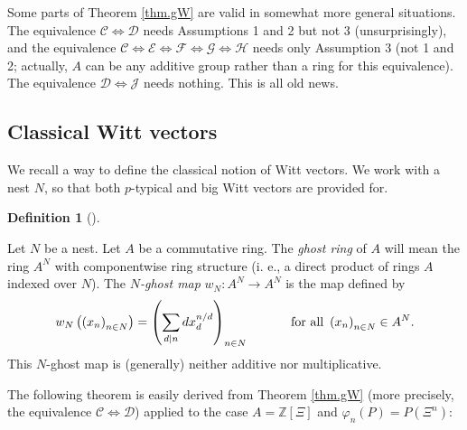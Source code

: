 \documentclass[numbers=enddot,12pt,final,onecolumn,notitlepage]{scrartcl}%
\theoremstyle{definition}
\newtheorem{defi}[theo]{Definition}
\newenvironment{definition}[1][]
{\begin{defi}[#1]\begin{leftbar}}
{\end{leftbar}\end{defi}}
\let\sumnonlimits\sum
\renewcommand{\sum}{\sumnonlimits\limits}
\begin{document}
Some parts of Theorem \ref{thm.gW} are valid in somewhat more general
situations. The equivalence $\mathcal{C}\Longleftrightarrow\mathcal{D}$ needs
Assumptions 1 and 2 but not 3 (unsurprisingly), and the equivalence
$\mathcal{C}\Longleftrightarrow\mathcal{E}\Longleftrightarrow\mathcal{F}%
\Longleftrightarrow\mathcal{G}\Longleftrightarrow\mathcal{H}$ needs only
Assumption 3 (not 1 and 2; actually, $A$ can be any additive group rather than
a ring for this equivalence). The equivalence $\mathcal{D}\Longleftrightarrow
\mathcal{J}$ needs nothing. This is all old news.

\subsection{Classical Witt vectors}

We recall a way to define the classical notion of Witt vectors. We work with a
nest $N$, so that both $p$-typical and big Witt vectors are provided for.

\begin{definition}
\label{def.Witt.ghostmap}Let $N$ be a nest. Let $A$ be a commutative ring. The
\textit{ghost ring} of $A$ will mean the ring $A^{N}$ with componentwise ring
structure (i. e., a direct product of rings $A$ indexed over $N$). The
$N$\textit{-ghost map} $w_{N}:A^{N}\rightarrow A^{N}$ is the map defined by%
\[
w_{N}\left(  \left(  x_{n}\right)  _{n\in N}\right)  =\left(  \sum
\limits_{d\mid n}dx_{d}^{n / d}\right)  _{n\in N}\ \ \ \ \ \ \ \ \ \ \text{for
all }\left(  x_{n}\right)  _{n\in N}\in A^{N}.
\]
This $N$-ghost map is (generally) neither additive nor multiplicative.
\end{definition}

The following theorem is easily derived from Theorem \ref{thm.gW} (more
precisely, the equivalence $\mathcal{C}\Longleftrightarrow\mathcal{D}$)
applied to the case $A=\mathbb{Z}\left[  \Xi\right]  $ and $\varphi_{n}\left(
P\right)  =P\left(  \Xi^{n}\right)  $:
\end{document}
